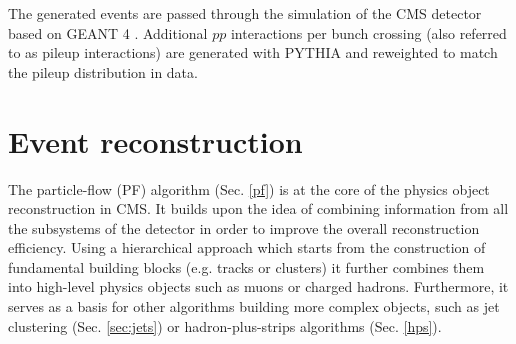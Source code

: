 The generated events are passed through the simulation of the CMS detector based on GEANT 4 \cite{GEANT4:2002zbu}. Additional $pp$ interactions per bunch crossing (also referred to as pileup interactions) are generated with PYTHIA and reweighted to match the pileup distribution in data. 

\section{Event reconstruction}\label{sec:reco}
The particle-flow (PF) algorithm (Sec. \ref{pf}) is at the core of the physics object reconstruction in CMS. It builds upon the idea of combining information from all the subsystems of the detector in order to improve the overall reconstruction efficiency. Using a hierarchical approach which starts from the construction of fundamental building blocks (e.g. tracks or clusters) it further combines them into high-level physics objects such as muons or charged hadrons. Furthermore, it serves as a basis for other algorithms building more complex objects, such as jet clustering (Sec. \ref{sec:jets}) or hadron-plus-strips algorithms (Sec. \ref{hps}). 

